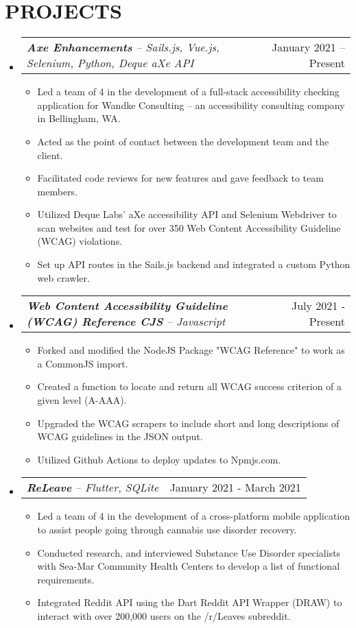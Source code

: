\documentclass[letterpaper,11pt]{article}
\makeatletter
\newcommand{\resumeItem}[1]{
  \item\small{
    {#1 \vspace{-1pt}}
  }
}
\newcommand{\resumeProjectHeading}[2]{
    \item
    \begin{tabular*}{\textwidth}{l@{\extracolsep{\fill}}r}
        \textit{\small#1} & {\color{dark-grey}\small #2}\vspace{2pt} \\
    \end{tabular*}\vspace{-5pt}
}
\newcommand{\resumeSubHeadingListStart}{\begin{itemize}[leftmargin=0in, label={}]}
\newcommand{\resumeSubHeadingListEnd}{\end{itemize}}
\newcommand{\resumeItemListStart}{\begin{itemize}}
\newcommand{\resumeItemListEnd}{\end{itemize}\vspace{0pt}}
\makeatother
\begin{document}
\section{PROJECTS}
    \resumeSubHeadingListStart
      \resumeProjectHeading
      {\textbf{Axe Enhancements} -- Sails.js, Vue.js, Selenium, Python, Deque aXe API}{January 2021 -- Present}
          \resumeItemListStart
            \resumeItem{Led a team of 4 in the development of a full-stack accessibility checking application for Wandke Consulting -- an accessibility consulting company in Bellingham, WA.}
            \resumeItem{Acted as the point of contact between the development team and the client.}
            \resumeItem{Facilitated code reviews for new features and gave feedback to team members.}
            \resumeItem{Utilized Deque Labs’ aXe accessibility API and Selenium Webdriver to scan websites and test for over 350 Web Content Accessibility Guideline (WCAG) violations.}
            \resumeItem{Set up API routes in the Sails.js backend and integrated a custom Python web crawler.}
          \resumeItemListEnd
          
        \resumeProjectHeading
         {\textbf{Web Content Accessibility Guideline (WCAG) Reference CJS} -- Javascript}{July 2021 - Present}
          \resumeItemListStart
            \resumeItem{Forked and modified the NodeJS Package "WCAG Reference" to work as a CommonJS import.}
            \resumeItem{Created a function to locate and return all WCAG success criterion of a given level (A-AAA).}
            \resumeItem{Upgraded the WCAG scrapers to include short and long descriptions of WCAG guidelines in the JSON output.}
            \resumeItem{Utilized Github Actions to deploy updates to Npmjs.com.}
          \resumeItemListEnd
          
        \iffalse
        \resumeProjectHeading
          {\textbf{UML Class Editor} -- Java, XML}{August 2021 - Present}  
          \resumeItemListStart
            \resumeItem{Implemented bug fixes, enhanced UI with accessibility features, upgraded deprecated API.}
            \resumeItem{Added functionality to export the current project to local storage in PDF format.}
            \resumeItem{Adjusted locations of menu items and added icons to increase usability.}
          \resumeItemListEnd
        \fi
          
        \resumeProjectHeading
          {\textbf{ReLeave} -- Flutter, SQLite}{January 2021 - March 2021}  
          \resumeItemListStart
            \resumeItem{Led a team of 4 in the development of a cross-platform mobile application to assist people going through cannabis use disorder recovery.}
            \resumeItem{Conducted research, and interviewed Substance Use Disorder specialists with Sea-Mar Community Health Centers to develop a list of functional requirements.}
            \resumeItem{Integrated Reddit API using the Dart Reddit API Wrapper (DRAW) to interact with over 200,000 users on the /r/Leaves subreddit.}
          \resumeItemListEnd
    \resumeSubHeadingListEnd
\end{document}
